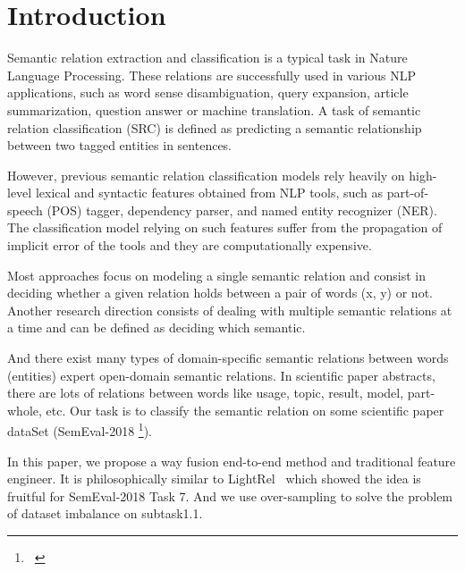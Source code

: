 \section{Introduction}
\label{sec:introduction}

Semantic relation extraction and classification is a typical task in Nature Language Processing. These relations are successfully used in various NLP applications, such as word sense disambiguation, query expansion, article summarization, question answer or machine translation. A task of semantic relation classification (SRC) is defined as predicting a semantic relationship between two tagged entities in sentences.

However, previous semantic relation classification models rely heavily on high-level lexical and syntactic features obtained from NLP tools, such as part-of-speech (POS) tagger, dependency parser, and named entity recognizer (NER). The classification model relying on such features suffer from the propagation of implicit error of the tools and they are computationally expensive.

Most approaches focus on modeling a single semantic relation and consist in deciding whether a given relation holds between a pair of words (x, y) or not. Another research direction consists of dealing with multiple semantic relations at a time and can be defined as deciding which semantic.

And there exist many types of domain-specific semantic relations between words (entities) expert open-domain semantic relations. In scientific paper abstracts, there are lots of relations between words like usage, topic, result, model, part-whole, etc. Our task is to classify the semantic relation on some scientific paper dataSet (SemEval-2018 \footnote{~\cite{SemEval2018Task7}}).

In this paper, we propose a way fusion end-to-end method and traditional feature engineer. It is philosophically similar to LightRel~\cite{renslow2018lightrel} which showed the idea is fruitful for SemEval-2018 Task 7. And we use over-sampling to solve the problem of dataset imbalance on subtask1.1.